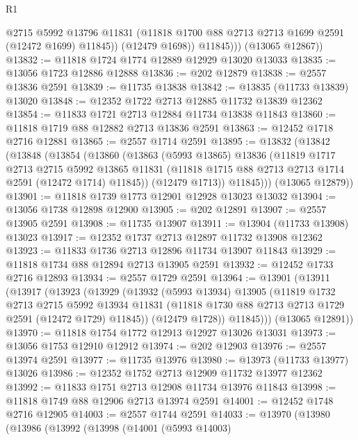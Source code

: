 \begin{lexlean}{R1}
\begin{coremodule}
                @2715
                @5992
                @13796
                @11831
                (@11818 @1700 @88 @2713 @2713 @1699 @2591 (@12472 @1699) @11845))
              (@12479 @1698))
            @11845)))
      (@13065 @12867))
@13832 := @11818 @1724 @1774 @12889 @12929 @13020 @13033
@13835 := @13056 @1723 @12886 @12888
@13836 := @202 @12879
@13838 := @2557 @13836 @2591
@13839 := @11735 @13838
@13842 := @13835 (@11733 @13839) @13020
@13848 := @12352 @1722 @2713 @12885 @11732 @13839 @12362
@13854 := @11833 @1721 @2713 @12884 @11734 @13838 @11843
@13860 := @11818 @1719 @88 @12882 @2713 @13836 @2591
@13863 := @12452 @1718 @2716 @12881
@13865 := @2557 @1714 @2591
@13895 := @13832
    (@13842
      (@13848
        (@13854
          (@13860
            (@13863
              (@5993 @13865)
              @13836
              (@11819
                @1717
                @2713
                @2715
                @5992
                @13865
                @11831
                (@11818 @1715 @88 @2713 @2713 @1714 @2591 (@12472 @1714) @11845))
              (@12479 @1713))
            @11845)))
      (@13065 @12879))
@13901 := @11818 @1739 @1773 @12901 @12928 @13023 @13032
@13904 := @13056 @1738 @12898 @12900
@13905 := @202 @12891
@13907 := @2557 @13905 @2591
@13908 := @11735 @13907
@13911 := @13904 (@11733 @13908) @13023
@13917 := @12352 @1737 @2713 @12897 @11732 @13908 @12362
@13923 := @11833 @1736 @2713 @12896 @11734 @13907 @11843
@13929 := @11818 @1734 @88 @12894 @2713 @13905 @2591
@13932 := @12452 @1733 @2716 @12893
@13934 := @2557 @1729 @2591
@13964 := @13901
    (@13911
      (@13917
        (@13923
          (@13929
            (@13932
              (@5993 @13934)
              @13905
              (@11819
                @1732
                @2713
                @2715
                @5992
                @13934
                @11831
                (@11818 @1730 @88 @2713 @2713 @1729 @2591 (@12472 @1729) @11845))
              (@12479 @1728))
            @11845)))
      (@13065 @12891))
@13970 := @11818 @1754 @1772 @12913 @12927 @13026 @13031
@13973 := @13056 @1753 @12910 @12912
@13974 := @202 @12903
@13976 := @2557 @13974 @2591
@13977 := @11735 @13976
@13980 := @13973 (@11733 @13977) @13026
@13986 := @12352 @1752 @2713 @12909 @11732 @13977 @12362
@13992 := @11833 @1751 @2713 @12908 @11734 @13976 @11843
@13998 := @11818 @1749 @88 @12906 @2713 @13974 @2591
@14001 := @12452 @1748 @2716 @12905
@14003 := @2557 @1744 @2591
@14033 := @13970
    (@13980
      (@13986
        (@13992
          (@13998
            (@14001
              (@5993 @14003)

\end{coremodule}
\end{lexlean}

